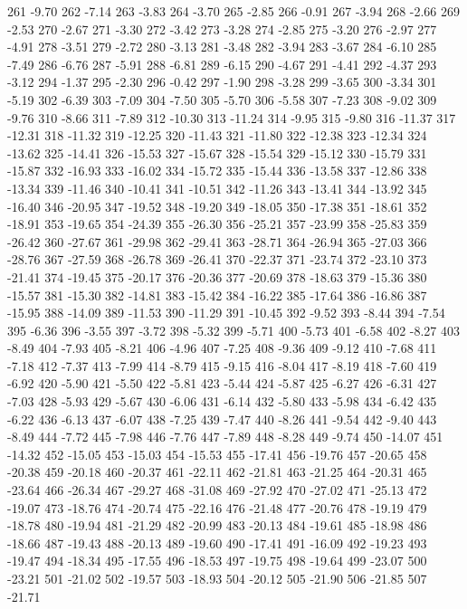 261 -9.70
262 -7.14
263 -3.83
264 -3.70
265 -2.85
266 -0.91
267 -3.94
268 -2.66
269 -2.53
270 -2.67
271 -3.30
272 -3.42
273 -3.28
274 -2.85
275 -3.20
276 -2.97
277 -4.91
278 -3.51
279 -2.72
280 -3.13
281 -3.48
282 -3.94
283 -3.67
284 -6.10
285 -7.49
286 -6.76
287 -5.91
288 -6.81
289 -6.15
290 -4.67
291 -4.41
292 -4.37
293 -3.12
294 -1.37
295 -2.30
296 -0.42
297 -1.90
298 -3.28
299 -3.65
300 -3.34
301 -5.19
302 -6.39
303 -7.09
304 -7.50
305 -5.70
306 -5.58
307 -7.23
308 -9.02
309 -9.76
310 -8.66
311 -7.89
312 -10.30
313 -11.24
314 -9.95
315 -9.80
316 -11.37
317 -12.31
318 -11.32
319 -12.25
320 -11.43
321 -11.80
322 -12.38
323 -12.34
324 -13.62
325 -14.41
326 -15.53
327 -15.67
328 -15.54
329 -15.12
330 -15.79
331 -15.87
332 -16.93
333 -16.02
334 -15.72
335 -15.44
336 -13.58
337 -12.86
338 -13.34
339 -11.46
340 -10.41
341 -10.51
342 -11.26
343 -13.41
344 -13.92
345 -16.40
346 -20.95
347 -19.52
348 -19.20
349 -18.05
350 -17.38
351 -18.61
352 -18.91
353 -19.65
354 -24.39
355 -26.30
356 -25.21
357 -23.99
358 -25.83
359 -26.42
360 -27.67
361 -29.98
362 -29.41
363 -28.71
364 -26.94
365 -27.03
366 -28.76
367 -27.59
368 -26.78
369 -26.41
370 -22.37
371 -23.74
372 -23.10
373 -21.41
374 -19.45
375 -20.17
376 -20.36
377 -20.69
378 -18.63
379 -15.36
380 -15.57
381 -15.30
382 -14.81
383 -15.42
384 -16.22
385 -17.64
386 -16.86
387 -15.95
388 -14.09
389 -11.53
390 -11.29
391 -10.45
392 -9.52
393 -8.44
394 -7.54
395 -6.36
396 -3.55
397 -3.72
398 -5.32
399 -5.71
400 -5.73
401 -6.58
402 -8.27
403 -8.49
404 -7.93
405 -8.21
406 -4.96
407 -7.25
408 -9.36
409 -9.12
410 -7.68
411 -7.18
412 -7.37
413 -7.99
414 -8.79
415 -9.15
416 -8.04
417 -8.19
418 -7.60
419 -6.92
420 -5.90
421 -5.50
422 -5.81
423 -5.44
424 -5.87
425 -6.27
426 -6.31
427 -7.03
428 -5.93
429 -5.67
430 -6.06
431 -6.14
432 -5.80
433 -5.98
434 -6.42
435 -6.22
436 -6.13
437 -6.07
438 -7.25
439 -7.47
440 -8.26
441 -9.54
442 -9.40
443 -8.49
444 -7.72
445 -7.98
446 -7.76
447 -7.89
448 -8.28
449 -9.74
450 -14.07
451 -14.32
452 -15.05
453 -15.03
454 -15.53
455 -17.41
456 -19.76
457 -20.65
458 -20.38
459 -20.18
460 -20.37
461 -22.11
462 -21.81
463 -21.25
464 -20.31
465 -23.64
466 -26.34
467 -29.27
468 -31.08
469 -27.92
470 -27.02
471 -25.13
472 -19.07
473 -18.76
474 -20.74
475 -22.16
476 -21.48
477 -20.76
478 -19.19
479 -18.78
480 -19.94
481 -21.29
482 -20.99
483 -20.13
484 -19.61
485 -18.98
486 -18.66
487 -19.43
488 -20.13
489 -19.60
490 -17.41
491 -16.09
492 -19.23
493 -19.47
494 -18.34
495 -17.55
496 -18.53
497 -19.75
498 -19.64
499 -23.07
500 -23.21
501 -21.02
502 -19.57
503 -18.93
504 -20.12
505 -21.90
506 -21.85
507 -21.71
